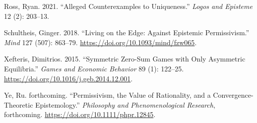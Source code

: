 \documentclass[
  11pt,
]{article}
\newlength{\cslhangindent}
\newlength{\cslentryspacingunit} %
\newenvironment{CSLReferences}[2] %
 {%
  \setlength{\parindent}{0pt}
  \ifodd #1
  \let\oldpar\par
  \def\par{\hangindent=\cslhangindent\oldpar}
  \fi
  \setlength{\parskip}{#2\cslentryspacingunit}
 }%
 {}
\begin{document}
\begin{CSLReferences}{1}{0}
\leavevmode{}%
Ross, Ryan. 2021. {``Alleged Counterexamples to Uniqueness.''} \emph{Logos and Episteme} 12 (2): 203--13.

\leavevmode{}%
Schultheis, Ginger. 2018. {``Living on the Edge: Against Epistemic Permissivism.''} \emph{Mind} 127 (507): 863--79. \url{https://doi.org/10.1093/mind/fzw065}.

\leavevmode{}%
Xefteris, Dimitrios. 2015. {``Symmetric Zero-Sum Games with Only Asymmetric Equilibria.''} \emph{Games and Economic Behavior} 89 (1): 122--25. \url{https://doi.org/10.1016/j.geb.2014.12.001}.

\leavevmode{}%
Ye, Ru. forthcoming. {``Permissivism, the Value of Rationality, and a Convergence-Theoretic Epistemology.''} \emph{Philosophy and Phenomenological Research}, forthcoming. \url{https://doi.org/10.1111/phpr.12845}.

\end{CSLReferences}
\end{document}

